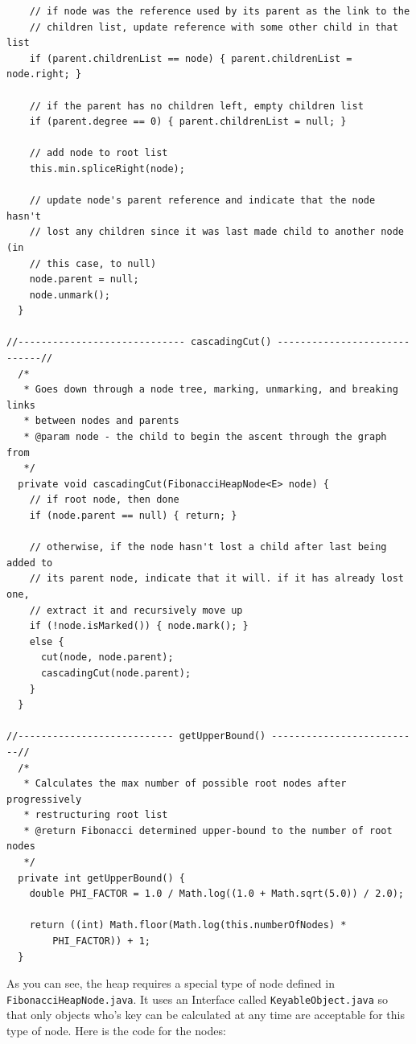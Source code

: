 \documentclass{article}
\begin{document}
\begin{lstlisting}
    // if node was the reference used by its parent as the link to the
    // children list, update reference with some other child in that list
    if (parent.childrenList == node) { parent.childrenList = node.right; }
    
    // if the parent has no children left, empty children list
    if (parent.degree == 0) { parent.childrenList = null; }
    
    // add node to root list
    this.min.spliceRight(node);
    
    // update node's parent reference and indicate that the node hasn't
    // lost any children since it was last made child to another node (in
    // this case, to null)
    node.parent = null;
    node.unmark();
  }
  
//----------------------------- cascadingCut() -----------------------------//
  /*
   * Goes down through a node tree, marking, unmarking, and breaking links
   * between nodes and parents 
   * @param node - the child to begin the ascent through the graph from
   */
  private void cascadingCut(FibonacciHeapNode<E> node) {
    // if root node, then done
    if (node.parent == null) { return; }
    
    // otherwise, if the node hasn't lost a child after last being added to
    // its parent node, indicate that it will. if it has already lost one,
    // extract it and recursively move up
    if (!node.isMarked()) { node.mark(); }
    else {
      cut(node, node.parent);
      cascadingCut(node.parent);
    }
  }

//--------------------------- getUpperBound() --------------------------//
  /*
   * Calculates the max number of possible root nodes after progressively
   * restructuring root list 
   * @return Fibonacci determined upper-bound to the number of root nodes 
   */
  private int getUpperBound() {
    double PHI_FACTOR = 1.0 / Math.log((1.0 + Math.sqrt(5.0)) / 2.0);
    
    return ((int) Math.floor(Math.log(this.numberOfNodes) *
        PHI_FACTOR)) + 1;
  }
\end{lstlisting}

As you can see, the heap requires a special type of node defined in \verb`FibonacciHeapNode.java`. It uses an Interface called \verb`KeyableObject.java` so that only objects who's key can 
be calculated at any time are acceptable for this type of node. Here is the code for the nodes:\\
\end{document}
